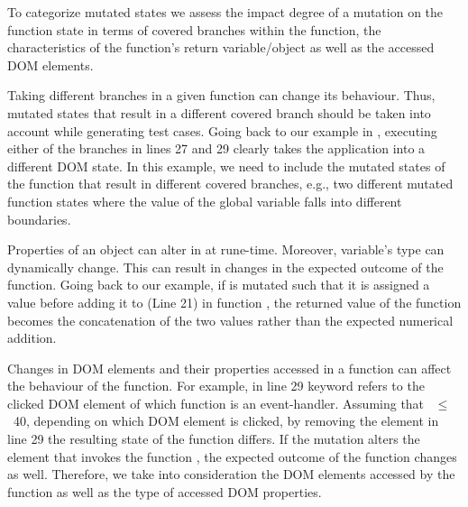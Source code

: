 To categorize mutated states we assess the impact degree of a mutation on the function state in terms of covered branches within the function, the characteristics of the function's return variable/object as well as the accessed DOM elements.
\begin{description}[noitemsep, leftmargin=0.4cm]
\item[Branch coverage:] Taking different branches in a given function can change its behaviour. Thus, mutated states that result in a different covered branch should be taken into account while generating test cases. Going back to our example in , executing either of the branches in lines 27 and 29 clearly takes the application into a different DOM state. In this example, we need to include the  mutated states of the  function that result in different covered branches, e.g., two different mutated function states where the value of the 
global variable  falls into different boundaries. 
\item[Return variable/object characteristics:] Properties of an object can alter in \javascript at rune-time. Moreover, variable's type can dynamically change. This can result in changes in the expected outcome of the function. Going back to our example, if  is mutated such that it is assigned a  value before adding it to  (Line 21) in function , the returned value of the function becomes the  concatenation of the two values rather than the expected numerical addition. 
\item[Accessed DOM properties:] Changes in DOM elements and their properties accessed in a function can affect the behaviour of the function. For example, in line 29  keyword refers to the clicked DOM element of which function  is an event-handler. Assuming that ~$\leq$~40, depending on which DOM element is clicked, by removing the element in line 29 the resulting state of the function  differs. If the mutation alters the element that invokes the function , the expected outcome of the function changes as well. 
Therefore, we take into consideration the DOM elements accessed by the function as well as the type of accessed DOM properties.
\end{description}

